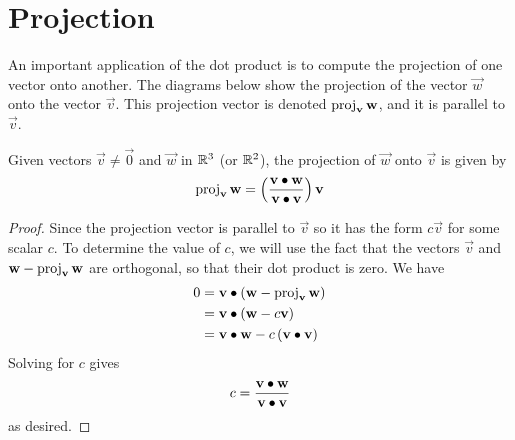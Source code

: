 \documentclass[handout]{ximera}
\begin{document}
\section{Projection}

An important application of the dot product is to compute the projection of one vector onto another.
The diagrams below show the projection of the vector $\vec{w}$ onto the vector $\vec{v}$. 
This projection vector is denoted $\operatorname{proj}_{\mathbf{v}} \mathbf{w}$,
and it is parallel to $\vec{v}$.

\begin{image}
\end{image}

\begin{proposition}
Given vectors $\vec{v} \neq \vec{0}$ and $\vec{w}$ in $\mathbb R^3$ (or $\mathbb R^2$), the projection of $\vec{w}$ onto $\vec{v}$ is given by
\[
\operatorname{proj}_{\mathbf{v}} \mathbf{w} = \left(\frac{\mathbf{v} \bullet \mathbf{w}}{\mathbf{v} \bullet \mathbf{v}}\right) \mathbf{v}
\]


\begin{proof}
Since the projection vector is parallel to $\vec{v}$ so it has the form $c \vec{v}$ for some scalar $c$.
To determine the value of $c$, we will use the fact that the vectors $\vec{v}$ and $\mathbf{w} - \operatorname{proj}_{\mathbf{v}} \mathbf{w}$ are orthogonal, 
so that their dot product is zero. We have
\begin{align*}
0 &= \mathbf{v} \bullet \left(\mathbf{w} - \operatorname{proj}_{\mathbf{v}} \mathbf{w} \right)\\
  &= \mathbf{v} \bullet \left(\mathbf{w} - c \mathbf{v}\right)\\
  &= \mathbf{v} \bullet \mathbf{w} - c \left( \mathbf{v} \bullet \mathbf{v} \right)
\end{align*}
Solving for $c$ gives
\[
c = \frac{\mathbf{v} \bullet \mathbf{w}}{\mathbf{v} \bullet \mathbf{v}}
\]
as desired.
\end{proof}
\end{proposition}
\end{document}
